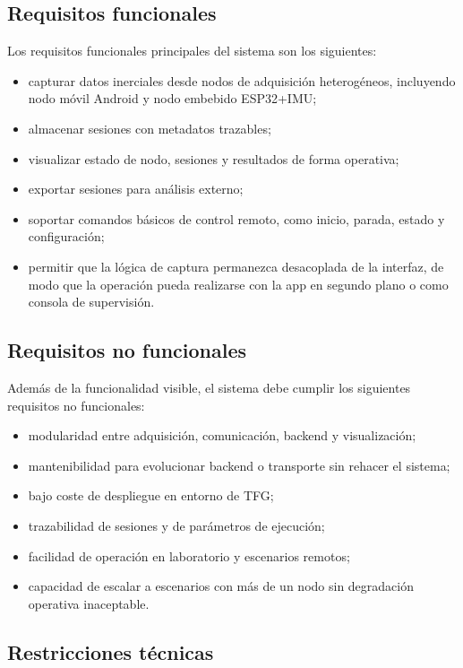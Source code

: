 \subsection{Requisitos funcionales}

Los requisitos funcionales principales del sistema son los siguientes:

\begin{itemize}
  \item capturar datos inerciales desde nodos de adquisición heterogéneos, incluyendo nodo móvil Android y nodo embebido ESP32+IMU;
  \item almacenar sesiones con metadatos trazables;
  \item visualizar estado de nodo, sesiones y resultados de forma operativa;
  \item exportar sesiones para análisis externo;
  \item soportar comandos básicos de control remoto, como inicio, parada, estado y configuración;
  \item permitir que la lógica de captura permanezca desacoplada de la interfaz, de modo que la operación pueda realizarse con la app en segundo plano o como consola de supervisión.
\end{itemize}

\subsection{Requisitos no funcionales}

Además de la funcionalidad visible, el sistema debe cumplir los siguientes requisitos no funcionales:

\begin{itemize}
  \item modularidad entre adquisición, comunicación, backend y visualización;
  \item mantenibilidad para evolucionar backend o transporte sin rehacer el sistema;
  \item bajo coste de despliegue en entorno de TFG;
  \item trazabilidad de sesiones y de parámetros de ejecución;
  \item facilidad de operación en laboratorio y escenarios remotos;
  \item capacidad de escalar a escenarios con más de un nodo sin degradación operativa inaceptable.
\end{itemize}

\subsection{Restricciones técnicas}

